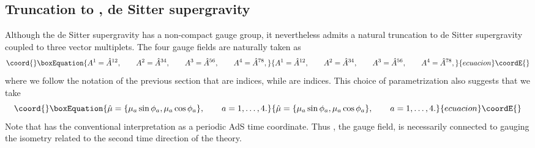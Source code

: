 \documentclass[a4paper,12pt]{article}
\begin{document}
\subsection{Truncation to \coordHE{}, \coordHE{} de Sitter supergravity}

Although the \coordHE{} de Sitter supergravity has a non-compact \coordHE{}
gauge group, it nevertheless admits a natural \coordHE{} truncation to \coordHE{} de Sitter supergravity coupled to
three vector multiplets.  The four gauge fields are naturally taken as
%
\begin{equation}\coord{}\boxEquation{
A^1=\hat A^{12},\qquad
A^2=\hat A^{34},\qquad
A^3=\hat A^{56},\qquad
A^4=\hat A^{78},
}{
A^1=\hat A^{12},\qquad
A^2=\hat A^{34},\qquad
A^3=\hat A^{56},\qquad
A^4=\hat A^{78},
}{ecuacion}\coordE{}\end{equation}
%
where we follow the notation of the previous section that
\coordHE{} are \coordHE{} indices, while \coordHE{} are \coordHE{}
indices.  This choice of parametrization also suggests that we take
%
\begin{equation}\coord{}\boxEquation{
\hat \mu=\{\mu_a\sin\phi_a,\mu_a\cos\phi_a\},\qquad a=1,\ldots,4.
}{
\hat \mu=\{\mu_a\sin\phi_a,\mu_a\cos\phi_a\},\qquad a=1,\ldots,4.
}{ecuacion}\coordE{}\end{equation}
%
Note that \coordHE{} has the conventional interpretation as a periodic
AdS\coordHE{} time coordinate.  Thus \coordHE{}, the \coordHE{} gauge field, is
necessarily connected to gauging the isometry related to the second time
direction of the \coordHE{} theory.
\end{document}
